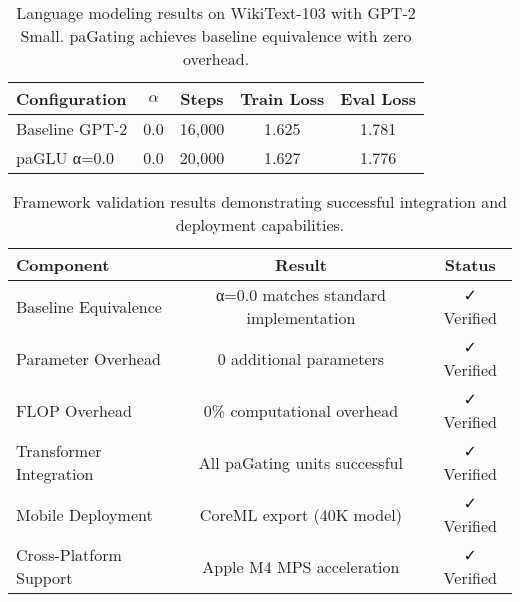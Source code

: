 \begin{table}[ht]
\centering
\caption{Language modeling results on WikiText-103 with GPT-2 Small. paGating achieves baseline equivalence with zero overhead.}
\label{tab:verified_nlp_results}
\begin{tabular}{lcccc}
\toprule
Configuration & $\alpha$ & Steps & Train Loss & Eval Loss \\
\midrule
Baseline GPT-2 & 0.0 & 16,000 & 1.625 & 1.781 \\
paGLU α=0.0 & 0.0 & 20,000 & 1.627 & 1.776 \\
\bottomrule
\end{tabular}
\end{table}

\begin{table}[ht]
\centering
\caption{Framework validation results demonstrating successful integration and deployment capabilities.}
\label{tab:framework_validation}
\begin{tabular}{lcc}
\toprule
Component & Result & Status \\
\midrule
Baseline Equivalence & α=0.0 matches standard implementation & ✓ Verified \\
Parameter Overhead & 0 additional parameters & ✓ Verified \\
FLOP Overhead & 0\% computational overhead & ✓ Verified \\
Transformer Integration & All paGating units successful & ✓ Verified \\
Mobile Deployment & CoreML export (40K model) & ✓ Verified \\
Cross-Platform Support & Apple M4 MPS acceleration & ✓ Verified \\
\bottomrule
\end{tabular}
\end{table}